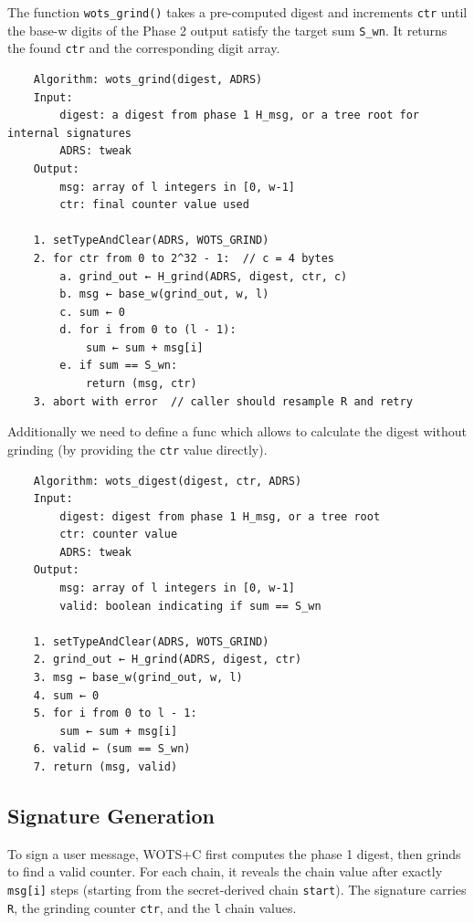 The function \texttt{wots\_grind()} takes a pre-computed digest and increments \texttt{ctr} until the base-w digits of the Phase 2 output satisfy the target sum \texttt{S\_wn}. It returns the found \texttt{ctr} and the corresponding digit array.

\begin{verbatim}
    Algorithm: wots_grind(digest, ADRS)
    Input:
        digest: a digest from phase 1 H_msg, or a tree root for internal signatures
        ADRS: tweak
    Output:
        msg: array of l integers in [0, w-1]
        ctr: final counter value used

    1. setTypeAndClear(ADRS, WOTS_GRIND)
    2. for ctr from 0 to 2^32 - 1:  // c = 4 bytes
        a. grind_out ← H_grind(ADRS, digest, ctr, c)
        b. msg ← base_w(grind_out, w, l)
        c. sum ← 0
        d. for i from 0 to (l - 1):
            sum ← sum + msg[i]
        e. if sum == S_wn:
            return (msg, ctr)
    3. abort with error  // caller should resample R and retry
\end{verbatim}

Additionally we need to define a func which allows to calculate the digest without grinding (by providing the \texttt{ctr} value directly).

\begin{verbatim}
    Algorithm: wots_digest(digest, ctr, ADRS)
    Input:
        digest: digest from phase 1 H_msg, or a tree root
        ctr: counter value
        ADRS: tweak
    Output:
        msg: array of l integers in [0, w-1]
        valid: boolean indicating if sum == S_wn

    1. setTypeAndClear(ADRS, WOTS_GRIND)
    2. grind_out ← H_grind(ADRS, digest, ctr)
    3. msg ← base_w(grind_out, w, l)
    4. sum ← 0
    5. for i from 0 to l - 1:
        sum ← sum + msg[i]
    6. valid ← (sum == S_wn)
    7. return (msg, valid)
\end{verbatim}

\subsection{Signature Generation}
To sign a user message, WOTS+C first computes the phase 1 digest, then grinds to find a valid counter. For each chain, it reveals the chain value after exactly \texttt{msg[i]} steps (starting from the secret-derived chain \texttt{start}). The signature carries \texttt{R}, the grinding counter \texttt{ctr}, and the \texttt{l} chain values.


